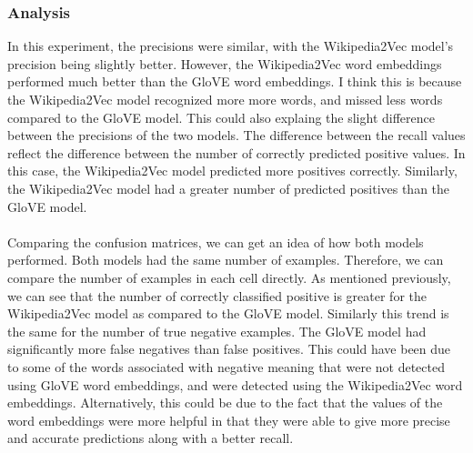 \documentclass[12pt]{article}
\begin{document}
\subsubsection{Analysis}
In this experiment, the precisions were similar, with the Wikipedia2Vec model's precision being slightly better. However, the Wikipedia2Vec word embeddings performed much better than the GloVE word embeddings. I think this is because the Wikipedia2Vec model recognized more more words, and missed less words compared to the GloVE model. This could also explaing the slight difference between the precisions of the two models. The difference between the recall values reflect the difference between the number of correctly predicted positive values. In this case, the Wikipedia2Vec model predicted more positives correctly. Similarly, the Wikipedia2Vec model had a greater number of predicted positives than the GloVE model.\\
\\
Comparing the confusion matrices, we can get an idea of how both models performed. Both models had the same number of examples. Therefore, we can compare the number of examples in each cell directly. As mentioned previously, we can see that the number of correctly classified positive is greater for the Wikipedia2Vec model as compared to the GloVE model. Similarly this trend is the same for the number of true negative examples. The GloVE model had significantly more false negatives than false positives. This could have been due to some of the words associated with negative meaning that were not detected using GloVE word embeddings, and were detected using the Wikipedia2Vec word embeddings. Alternatively, this could be due to the fact that the values of the word embeddings were more helpful in that they were able to give more precise and accurate predictions along with a better recall.
\end{document}
